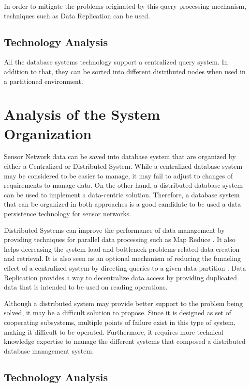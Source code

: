 In order to mitigate the problems originated by this query processing
mechanism, techniques such as Data Replication can be used.

\subsection{Technology Analysis}

All the database systems technology support a centralized query system. In
addition to that, they can be sorted into different distributed nodes when
used in a partitioned environment.

\section{Analysis of the System Organization}

Sensor Network data can be saved into database system that are organized
by either a Centralized or Distributed System. While a centralized database
system may be considered to be easier to manage, it may fail to adjust to
changes of requirements to manage data. On the other hand, a distributed
database system can be used to implement a data-centric solution. Therefore, a
database system that can be organized in both approaches is a good candidate to
be used a data persistence technology for sensor networks.

Distributed Systems can improve the performance of data management by providing
techniques for parallel data processing such as Map Reduce \cite{map-reduce,
bigtable}. It also helps decreasing the system load and bottleneck problems
related data creation and retrieval. It is also seen as an optional mechanism
of reducing the funneling effect of a centralized system by directing queries
to a given data partition \cite{sn-storage04}. Data Replication
\cite{data-replication} provides a way to decentralize data access by
providing duplicated data that is intended to be used on reading operations.

Although a distributed system may provide better support to the problem being
solved, it may be a difficult solution to propose. Since it is designed as set
of cooperating subsystems, multiple points of failure exist in this type of
system, making it difficult to be operated. Furthermore, it requires more
technical knowledge expertise to manage the different systems that composed a
distributed database management system.

\subsection{Technology Analysis}

